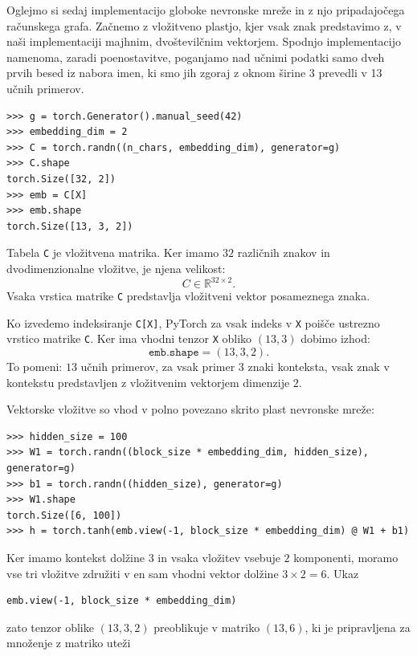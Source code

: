 Oglejmo si sedaj implementacijo globoke nevronske mreže in z njo pripadajočega računskega grafa. Začnemo z vložitveno plastjo, kjer vsak znak predstavimo z, v naši implementaciji majhnim, dvoštevilčnim vektorjem. Spodnjo implementacijo namenoma, zaradi poenostavitve, poganjamo nad učnimi podatki samo dveh prvih besed iz nabora imen, ki smo jih zgoraj z oknom širine 3 prevedli v 13 učnih primerov.
%
\vspace*{3mm}
\begin{lstlisting}
>>> g = torch.Generator().manual_seed(42)
>>> embedding_dim = 2
>>> C = torch.randn((n_chars, embedding_dim), generator=g)
>>> C.shape
torch.Size([32, 2])
>>> emb = C[X]
>>> emb.shape
torch.Size([13, 3, 2])
\end{lstlisting}

Tabela \texttt{C} je vložitvena matrika. Ker imamo $32$ različnih znakov in dvodimenzionalne vložitve, je njena velikost:
\[
C \in \mathbb{R}^{32 \times 2}.
\]
Vsaka vrstica matrike \texttt{C} predstavlja vložitveni vektor posameznega znaka.

Ko izvedemo indeksiranje \texttt{C[X]}, PyTorch za vsak indeks v \texttt{X} poišče ustrezno vrstico matrike \texttt{C}. Ker ima vhodni tenzor \texttt{X} obliko $(13, 3)$ dobimo izhod:
\[
\texttt{emb.shape} = (13, 3, 2).
\]
To pomeni: $13$ učnih primerov, za vsak primer $3$ znaki konteksta, vsak znak v kontekstu predstavljen z vložitvenim vektorjem dimenzije $2$.

Vektorske vložitve so vhod v polno povezano skrito plast nevronske mreže:
%
\vspace*{3mm}
\begin{lstlisting}
>>> hidden_size = 100
>>> W1 = torch.randn((block_size * embedding_dim, hidden_size), generator=g)
>>> b1 = torch.randn((hidden_size), generator=g)
>>> W1.shape
torch.Size([6, 100])
>>> h = torch.tanh(emb.view(-1, block_size * embedding_dim) @ W1 + b1)
\end{lstlisting}
%
Ker imamo kontekst dolžine $3$ in vsaka vložitev vsebuje $2$ komponenti, moramo vse tri vložitve združiti v en sam vhodni vektor dolžine $3 \times 2 = 6$. Ukaz
%
%
\vspace*{3mm}
\begin{lstlisting}
emb.view(-1, block_size * embedding_dim)
\end{lstlisting}
zato tenzor oblike $(13, 3, 2)$ preoblikuje v matriko $(13, 6)$, ki je pripravljena za množenje z matriko uteži

